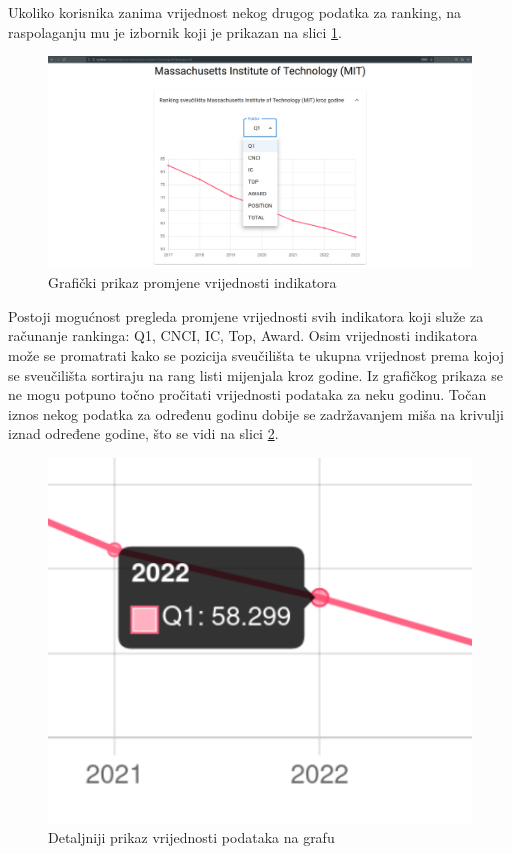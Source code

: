 \documentclass[times, utf8, zavrsni]{fer}
\begin{document}
Ukoliko korisnika zanima vrijednost nekog drugog podatka za ranking, na raspolaganju mu je izbornik 
koji je prikazan na slici \ref{fig:unipage2}. 
\begin{figure}[htb]
    \hspace*{-2cm}  
       \includegraphics[scale=0.21]{uni2.png} 
       \caption{Grafički prikaz promjene vrijednosti indikatora}
       \label{fig:unipage2}
       \end{figure}
Postoji mogućnost pregleda promjene vrijednosti svih indikatora koji služe za računanje rankinga: Q1, CNCI, IC, Top, Award. 
Osim vrijednosti indikatora može se promatrati kako se pozicija  sveučilišta te ukupna vrijednost  prema kojoj se sveučilišta 
sortiraju na rang listi mijenjala kroz godine. Iz grafičkog prikaza se ne mogu potpuno točno pročitati vrijednosti podataka za neku godinu. Točan iznos 
nekog podatka za određenu godinu dobije se zadržavanjem miša na krivulji iznad određene godine, što se vidi na slici \ref{fig:detail}.
\begin{figure}[htb]
            \centering
               \includegraphics[scale=0.4]{detail.png} 
               \caption{Detaljniji prikaz vrijednosti podataka na grafu}
               \label{fig:detail}
               \end{figure}           
\end{document}
